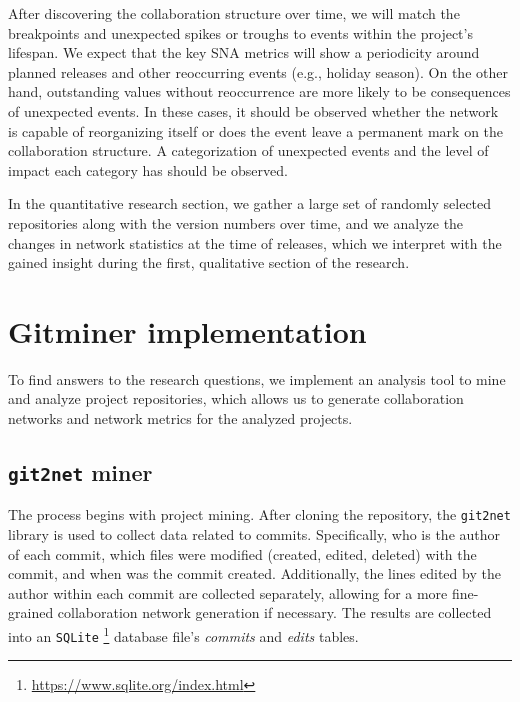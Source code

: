 After discovering the collaboration structure over time, we will match the breakpoints and unexpected spikes or troughs to events within the project's lifespan. We expect that the key SNA metrics will show a periodicity around planned releases and other reoccurring events (e.g., holiday season). On the other hand, outstanding values without reoccurrence are more likely to be consequences of unexpected events. In these cases, it should be observed whether the network is capable of reorganizing itself or does the event leave a permanent mark on the collaboration structure. A categorization of unexpected events and the level of impact each category has should be observed.

In the quantitative research section, we gather a large set of randomly selected repositories along with the version numbers over time, and we analyze the changes in network statistics at the time of releases, which we interpret with the gained insight during the first, qualitative section of the research.


\section{Gitminer implementation}
\label{sec:gitminer}
To find answers to the research questions, we implement an analysis tool to mine and analyze project repositories, which allows us to generate collaboration networks and network metrics for the analyzed projects.

\subsection{\texttt{git2net} miner}
The process begins with project mining. After cloning the repository, the  \texttt{git2net} \cite{goteAnalysingTimeStampedCoEditing2019} library is used to collect data related to commits. Specifically, who is the author of each commit, which files were modified (created, edited, deleted) with the commit, and when was the commit created. Additionally, the lines edited by the author within each commit are collected separately, allowing for a more fine-grained collaboration network generation if necessary. The results are collected into an \texttt{SQLite} \footnote{\url{https://www.sqlite.org/index.html}} database file's \textit{commits} and \textit{edits} tables.

